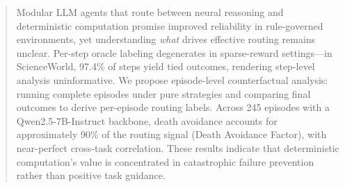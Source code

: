 \begin{abstract}
Modular LLM agents that route between neural reasoning and deterministic computation promise improved reliability in rule-governed environments, yet understanding \emph{what} drives effective routing remains unclear. Per-step oracle labeling degenerates in sparse-reward settings---in ScienceWorld, 97.4\% of steps yield tied outcomes, rendering step-level analysis uninformative. We propose episode-level counterfactual analysis: running complete episodes under pure strategies and comparing final outcomes to derive per-episode routing labels. Across 245 episodes with a Qwen2.5-7B-Instruct backbone, death avoidance accounts for approximately 90\% of the routing signal (Death Avoidance Factor), with near-perfect cross-task correlation. These results indicate that deterministic computation's value is concentrated in catastrophic failure prevention rather than positive task guidance.
\end{abstract}
